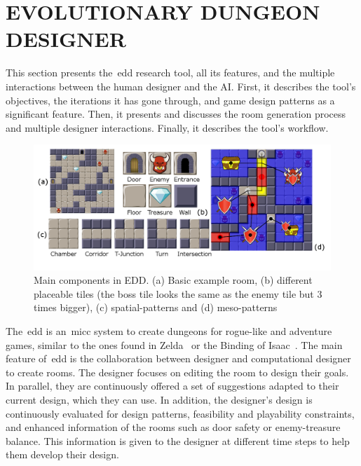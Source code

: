 \section[EVOLUTIONARY DUNGEON DESIGNER]{EVOLUTIONARY DUNGEON \\DESIGNER}

This section presents the~\acrfull{edd} research tool, all its features, and the multiple interactions between the human designer and the AI. First, it describes the tool's objectives, the iterations it has gone through, and game design patterns as a significant feature. Then, it presents and discusses the room generation process and multiple designer interactions. Finally, it describes the tool's workflow.


\begin{figure}[!h]
\centerline{\includegraphics[width=\textwidth]{figures/EDD-figs/map-figure.png}}
\caption{Main components in EDD. (a) Basic example room, (b) different placeable tiles (the boss tile looks the same as the enemy tile but 3 times bigger), (c) spatial-patterns and (d) meso-patterns} \label{fig:tilesPats}
\end{figure}

The~\acrshort{edd} is an~\acrshort{micc} system to create dungeons for rogue-like and adventure games, similar to the ones found in Zelda~\cite{tloz} or the Binding of Isaac~\cite{bindingISAAC}. The main feature of~\acrshort{edd} is the collaboration between designer and computational designer to create rooms. The designer focuses on editing the room to design their goals. In parallel, they are continuously offered a set of suggestions adapted to their current design, which they can use. In addition, the designer's design is continuously evaluated for design patterns, feasibility and playability constraints, and enhanced information of the rooms such as door safety or enemy-treasure balance. This information is given to the designer at different time steps to help them develop their design.

